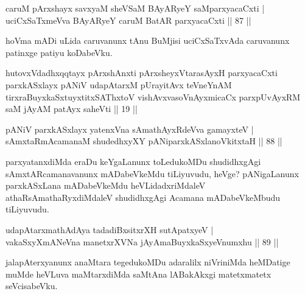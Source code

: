 
\begin{shl}
caruM pArxshayx savxyaM sheVSaM BAyARyeY saMparxyacaCxti | \\
uciCxSaTxmeVva BAyARyeY caruM BatAR parxyacaCxti \hfill|| 87 || 
\end{shl}

\begin{artha}
hoVma mADi uLida caruvanunx tAnu BuMjisi uciCxSaTxvAda caruvanunx 
patinxge patiyu koDabeVku.
\end{artha}

\begin{kandikeshl}
hutovxVdadhxqqtayx pArxshAnxti pArxsheyxVtarasAyxH parxyacaCxti parxkASxlayx pANiV udapAtarxM pUrayitAvx teVneYnAM tirxraBuyxkaSxtuyxtitxSAThxtoV vishAvxvasoV\s nAyxmicaCx parxpUvAyxRM saM jAyAM patAyx saheVti || 19 ||
\end{kandikeshl}

\begin{shl}
pANiV parxkASxlayx yatenxVna sAmathAyxRdeVva gamayxteV | \\
sAmxtaRmAcamanaM shudedhxyXY pANiparxkASxlanoVkitxtaH \hfill|| 88 || 
\end{shl}

\begin{artha}
parxyatanxdiMda eraDu keYgaLanunx toLedukoMDu shudidhxgAgi 
sAmxtARcamanavanunx mADabeVkeMdu tiLiyuvudu, heVge? pANigaLanunx 
parxkASxLana mADabeVkeMdu heVLidadxriMdaleV athaRsAmathaRyxdiMdaleV
shudidhxgAgi Acamana mADabeVkeMbudu tiLiyuvudu.
\end{artha}


\begin{shl}
udapAtarxmathA\s \s dAya tadadiBxsitxrXH sutApatxyeV | \\
vakaSxyXmANeVna manetxrXVNa jAyAmaBuyxkaSxyeVnumxhu \hfill|| 89 || 
\end{shl}

\begin{artha}
jalapAterxyanunx anaMtara tegedukoMDu adaralilx niVriniMda heMDatige muMde heVLuva maMtarxdiMda saMtAna lABakAkxgi matetxmatetx seVcisabeVku.
\end{artha}



